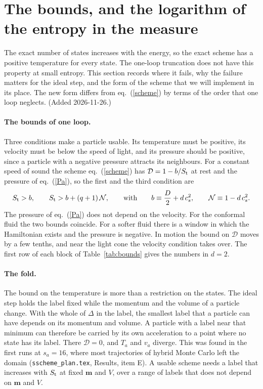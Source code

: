 \documentclass[11pt,aps,preprint,nofootinbib,superscriptaddress,tightenlines]{revtex4-2}
\def\st{\begin{equation}}
\def\stp{\end{equation}}
\def\Eq#1{eq.~(\ref{#1})}
\def\Tab#1{Table~\ref{#1}}
\let\oldparagraph\paragraph
\renewcommand{\paragraph}{\par\bigskip\oldparagraph}
\begin{document}
\section{The bounds, and the logarithm of the entropy in the measure}
\label{sec:bounds}

The exact number of states increases with the energy, so the exact scheme has a positive temperature for every state.  The one-loop truncation does
not have this property at small entropy.  This section records where it fails, why the failure matters for the ideal step, and the form of the scheme
that we will implement in its place.  The new form differs from \Eq{scheme} by terms of the order that one loop neglects.  (Added 2026-11-26.)

\paragraph{The bounds of one loop.}  Three conditions make a particle usable.  Its temperature must be positive, its velocity must be below the speed
of light, and its pressure should be positive, since a particle with a negative pressure attracts its neighbours.  For a constant speed of sound
the scheme \Eq{scheme} has $\mathcal D=1-b/S_{\rm t}$ at rest and the pressure of \Eq{Pa}, so the first and the third condition are
\st
S_{\rm t}>b,\qquad S_{\rm t}>b+(q+1)\,\mathcal N,\qquad\text{with}\qquad b\equiv\frac D2+d\,c_s^2,\qquad \mathcal N\equiv1-d\,c_s^2 .
\label{bounds1}
\stp
The pressure of \Eq{Pa} does not depend on the velocity.  For the conformal fluid the two bounds coincide.  For a softer fluid there is a window in
which the Hamiltonian exists and the pressure is negative.  In motion the bound on $\mathcal D$ moves by a few tenths, and near the light cone the
velocity condition takes over.  The first row of each block of \Tab{tab:bounds} gives the numbers in $d=2$.

\paragraph{The fold.}  The bound on the temperature is more than a restriction on the states.  The ideal step holds the label fixed while the
momentum and the volume of a particle change.  With the whole of $\Delta$ in the label, the smallest label that a particle can have depends on its
momentum and volume.  A particle with a label near that minimum can therefore be carried by its own acceleration to a point where no state has its
label.  There $\mathcal D=0$, and $T_a$ and $v_a$ diverge.  This was found in the first runs at $s_a=16$, where most trajectories of hybrid Monte Carlo
left the domain (\nolinkurl{sscheme_plan.tex}, Results, item E).  A usable scheme needs a label that increases with $S_{\rm t}$ at fixed $\bm m$ and
$V$, over a range of labels that does not depend on $\bm m$ and $V$.
\end{document}
